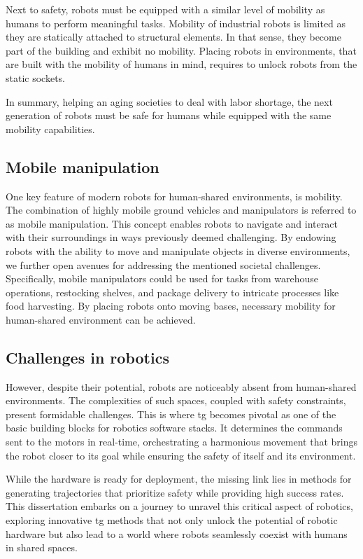 Next to
safety, robots must be equipped with a similar level of
mobility as humans to perform meaningful tasks. Mobility of
industrial robots is limited as they are statically
attached to structural elements. In that sense, they become
part of the building and exhibit no mobility. Placing
robots in environments, that are built with the mobility of
humans in mind, requires to unlock robots from the static
sockets.

In summary, helping an aging societies to deal with labor
shortage, the next generation of robots must be safe for
humans while equipped with the same mobility capabilities.

\subsection{Mobile manipulation}
\label{sec:mobile_manipulation}

One key feature of modern robots for human-shared
environments, is mobility. The combination of highly mobile
ground vehicles and manipulators is referred to as mobile
manipulation. This concept enables robots to navigate and
interact with their surroundings in ways previously deemed
challenging. By endowing robots with the ability to move and
manipulate objects in diverse environments, we further open
avenues for addressing the mentioned societal challenges.
Specifically, mobile manipulators could be used for tasks
from warehouse operations, restocking shelves, and package
delivery to intricate processes like food harvesting.
By placing robots onto moving bases, necessary mobility for
human-shared environment can be achieved.

\subsection{Challenges in robotics}

However, despite their potential, robots are noticeably
absent from human-shared environments. The complexities of
such spaces, coupled with safety constraints, present
formidable challenges. This is where \ac{tg}
becomes pivotal as one of the basic building blocks for
robotics software stacks. It determines the commands sent to
the motors in real-time, orchestrating a harmonious movement
that brings the robot closer to its goal while ensuring the
safety of itself and its environment.

While the hardware is ready for deployment, the
missing link lies in methods for generating trajectories
that prioritize safety while providing high success rates.
This dissertation embarks on a journey to unravel this
critical aspect of robotics, exploring innovative \ac{tg}
methods that not only unlock the potential of
robotic hardware but also lead to a world where robots
seamlessly coexist with humans in shared spaces.

